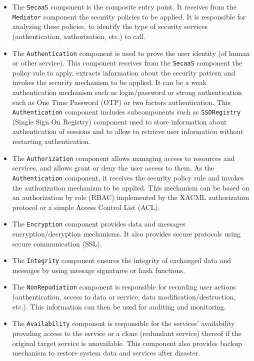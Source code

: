 \documentclass[runningheads,a4paper]{llncs}
\begin{document}
\begin{itemize}
\settowidth{\leftmargin}{{\Large$\square$}}\advance\leftmargin{}
\itemsep8pt\relax
\renewcommand\labelitemi{{\lower1.5pt\hbox{\Large$\square$}}}

\item The \texttt{SecaaS} component is the composite entry point. It receives from the \texttt{Mediator} component the security policies to be applied. It is responsible for analyzing these policies, to identify the type of security services (authentication, authorization, etc.) to call.
\item The \texttt{Authentication} component is used to prove the user identity (of human or other service). This component receives from the \texttt{SecaaS} component the policy rule to apply, extracts information about the security pattern and invokes the security mechanism to be applied. It can be a weak authentication mechanism such as login/password or strong authentication such as One Time Password (OTP) or two factors authentication. This \texttt{Authentication} component includes subcomponents such as \texttt{SSORegistry} (Single Sign On Registry) component used to store information about  authentication of sessions and to allow to retrieve user information without restarting authentication.

\item The \texttt{Authorization} component allows managing access to resources and services, and allows grant or deny the user access to them. As the \texttt{Authentication} component, it receives the security policy rule and invokes the authorization mechanism to be applied. This mechanism can be based on an authorization by role (RBAC) implemented by the XACML authorization protocol or a simple Access Control List (ACL).
\item The \texttt{Encryption} component provides data and messages encryption/decryption mechanisms. It also provides secure protocols using secure communication (SSL).
\item The \texttt{Integrity} component ensures the integrity of exchanged data and messages by using message signatures or hash functions.
\item The \texttt{NonRepudiation} component is responsible for recording user actions (authentication, access to data or service, data modification/destruction, etc.). This information can then be used for auditing and monitoring.
\item The \texttt{Availability} component is responsible for the services' availability providing access to the service or a clone (redundant service) thereof if the original target service is unavailable. This component also provides backup mechanism to restore system data and services after disaster.

\end{itemize}
\end{document}
